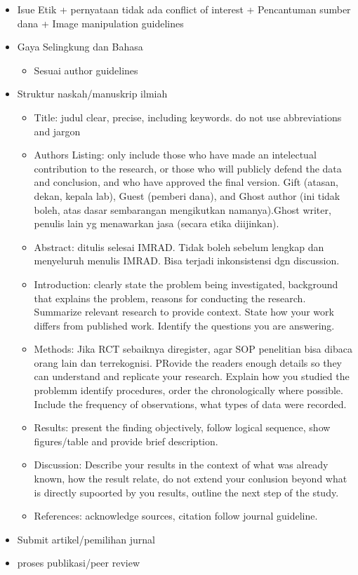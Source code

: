 \documentclass[
  letterpaper,
  DIV=11,
  numbers=noendperiod]{scrreprt}
\providecommand{\tightlist}{%
  \setlength{\itemsep}{0pt}\setlength{\parskip}{0pt}}\usepackage{longtable,booktabs,array}
\begin{document}
\begin{itemize}
\item
  Isue Etik + pernyataan tidak ada conflict of interest + Pencantuman
  sumber dana + Image manipulation guidelines
\item
  Gaya Selingkung dan Bahasa

  \begin{itemize}
  \tightlist
  \item
    Sesuai author guidelines
  \end{itemize}
\item
  Struktur naskah/manuskrip ilmiah

  \begin{itemize}
  \tightlist
  \item
    Title: judul clear, precise, including keywords. do not use
    abbreviations and jargon
  \item
    Authors Listing: only include those who have made an intelectual
    contribution to the research, or those who will publicly defend the
    data and conclusion, and who have approved the final version. Gift
    (atasan, dekan, kepala lab), Guest (pemberi dana), and Ghost author
    (ini tidak boleh, atas dasar sembarangan mengikutkan namanya).Ghost
    writer, penulis lain yg menawarkan jasa (secara etika diijinkan).
  \item
    Abstract: ditulis selesai IMRAD. Tidak boleh sebelum lengkap dan
    menyeluruh menulis IMRAD. Bisa terjadi inkonsistensi dgn discussion.
  \item
    Introduction: clearly state the problem being investigated,
    background that explains the problem, reasons for conducting the
    research. Summarize relevant research to provide context. State how
    your work differs from published work. Identify the questions you
    are answering.
  \item
    Methods: Jika RCT sebaiknya diregister, agar SOP penelitian bisa
    dibaca orang lain dan terrekognisi. PRovide the readers enough
    details so they can understand and replicate your research. Explain
    how you studied the problemm identify procedures, order the
    chronologically where possible. Include the frequency of
    observations, what types of data were recorded.
  \item
    Results: present the finding objectively, follow logical sequence,
    show figures/table and provide brief description.
  \item
    Discussion: Describe your results in the context of what was already
    known, how the result relate, do not extend your conlusion beyond
    what is directly supoorted by you results, outline the next step of
    the study.
  \item
    References: acknowledge sources, citation follow journal guideline.
  \end{itemize}
\item
  Submit artikel/pemilihan jurnal
\item
  proses publikasi/peer review
\end{itemize}
\end{document}
